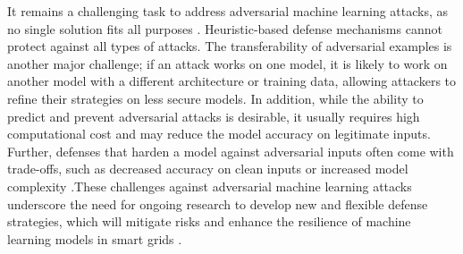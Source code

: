 \documentclass[10pt, journal]{IEEEtran}
\begin{document}
It remains a challenging task to address adversarial machine learning attacks, as no single solution fits all purposes \cite{zuhlke2024adversarial, zhao2024evaluating}. Heuristic-based defense mechanisms cannot protect against all types of attacks. The transferability of adversarial examples is another major challenge; if an attack works on one model, it is likely to work on another model with a different architecture or training data, allowing attackers to refine their strategies on less secure models. In addition, while the ability to predict and prevent adversarial attacks is desirable, it usually requires high computational cost and may reduce the model accuracy on legitimate inputs. Further, defenses that harden a model against adversarial inputs often come with trade-offs, such as decreased accuracy on clean inputs or increased model complexity \cite{yuan2019adversarial}.These challenges against adversarial machine learning attacks underscore the need for ongoing research to develop new and flexible defense strategies, which will mitigate risks and enhance the resilience of machine learning models in smart grids \cite{wiyatno2019adversarial, yuan2019adversarial, ilahi2021challenges}. 





\end{document}
